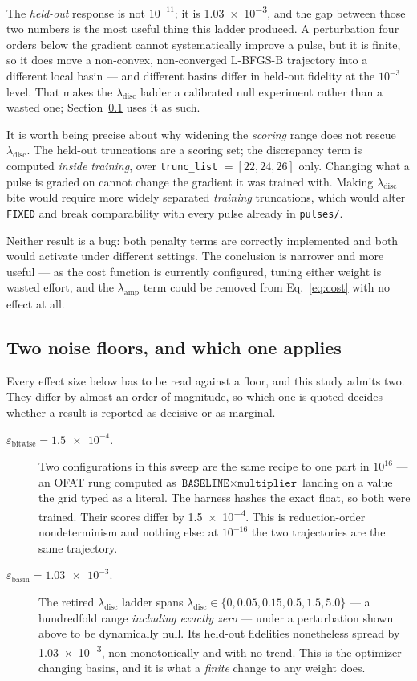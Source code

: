 \documentclass[11pt]{article}
\newcommand{\lama}{\lambda_{\mathrm{amp}}}
\newcommand{\lamdisc}{\lambda_{\mathrm{disc}}}
\begin{document}
The \emph{held-out} response is not $10^{-11}$; it is \num{1.03e-3}, and the gap between those
two numbers is the most useful thing this ladder produced. A perturbation four orders below the
gradient cannot systematically improve a pulse, but it is finite, so it does move a non-convex,
non-converged L-BFGS-B trajectory into a different local basin --- and different basins differ
in held-out fidelity at the $10^{-3}$ level. That makes the $\lamdisc$ ladder a calibrated null
experiment rather than a wasted one; Section~\ref{sec:floors} uses it as such.

It is worth being precise about why widening the \emph{scoring} range does not rescue $\lamdisc$.
The held-out truncations are a scoring set; the discrepancy term is computed \emph{inside
training}, over \texttt{trunc\_list} $= [22, 24, 26]$ only. Changing what a pulse is graded on
cannot change the gradient it was trained with. Making $\lamdisc$ bite would require more widely
separated \emph{training} truncations, which would alter \texttt{FIXED} and break comparability
with every pulse already in \texttt{pulses/}.

Neither result is a bug: both penalty terms are correctly implemented and both would activate
under different settings. The conclusion is narrower and more useful --- as the cost function is
currently configured, tuning either weight is wasted effort, and the $\lama$ term could be
removed from Eq.~\eqref{eq:cost} with no effect at all.

\subsection{Two noise floors, and which one applies}
\label{sec:floors}

Every effect size below has to be read against a floor, and this study admits two. They differ by
almost an order of magnitude, so which one is quoted decides whether a result is reported as
decisive or as marginal.

\begin{description}
  \item[$\varepsilon_{\mathrm{bitwise}} = \num{1.5e-4}$.] Two configurations in this sweep are the
    same recipe to one part in $10^{16}$ --- an OFAT rung computed as
    $\texttt{BASELINE}\times\texttt{multiplier}$ landing on a value the grid typed as a literal.
    The harness hashes the exact float, so both were trained. Their scores differ by
    \num{1.5e-4}. This is reduction-order nondeterminism and nothing else: at $10^{-16}$ the two
    trajectories are the same trajectory.
  \item[$\varepsilon_{\mathrm{basin}} = \num{1.03e-3}$.] The retired $\lamdisc$ ladder spans
    $\lamdisc \in \{0, 0.05, 0.15, 0.5, 1.5, 5.0\}$ --- a hundredfold range \emph{including
    exactly zero} --- under a perturbation shown above to be dynamically null. Its held-out
    fidelities nonetheless spread by \num{1.03e-3}, non-monotonically and with no trend. This is
    the optimizer changing basins, and it is what a \emph{finite} change to any weight does.
\end{description}
\end{document}
